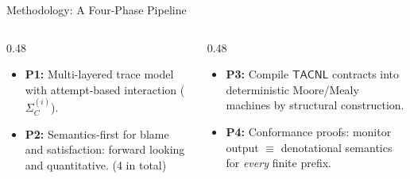 \documentclass[9pt,aspectratio=169]{beamer}
\newcommand{\logic}[1]{\ensuremath{\mathsf{#1}}\xspace}
\newcommand{\cDL}{\logic{TACNL}}
\begin{document}
\begin{frame}{Methodology: A Four-Phase Pipeline}
\begin{center}
\end{center}

\vspace{2mm}
\begin{columns}[T]
\begin{column}{0.48\textwidth}
  \small
  \begin{itemize}
    \item \textbf{P1:} Multi-layered trace model with attempt-based interaction ($\Sigma_C^{(i)}$).
    \item \textbf{P2:} Semantics-first for blame and satisfaction: forward looking and quantitative. (4 in total)
  \end{itemize}
\end{column}
\begin{column}{0.48\textwidth}
  \small
  \begin{itemize}
    \item \textbf{P3:} Compile \cDL contracts into deterministic Moore/Mealy machines by structural construction.
    \item \textbf{P4:} Conformance proofs: monitor output $\equiv$ denotational semantics for \emph{every} finite prefix.
  \end{itemize}
\end{column}
\end{columns}
\end{frame}
\end{document}
